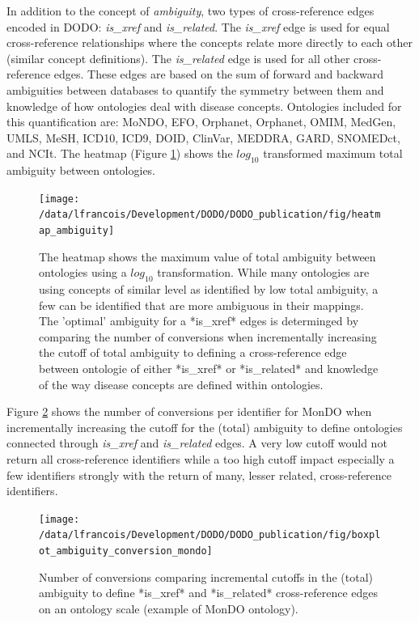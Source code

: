 \documentclass[9pt,a4paper,]{extarticle}
\begin{document}
In addition to the concept of \emph{ambiguity}, two types of cross-reference edges encoded in DODO: \emph{is\_xref} and \emph{is\_related}. The \emph{is\_xref} edge is used for equal cross-reference relationships where the concepts relate more directly to each other (similar concept definitions). The \emph{is\_related} edge is used for all other cross-reference edges. These edges are based on the sum of forward and backward ambiguities between databases to quantify the symmetry between them and knowledge of how ontologies deal with disease concepts. Ontologies included for this quantification are: MoNDO, EFO, Orphanet, Orphanet, OMIM, MedGen, UMLS, MeSH, ICD10, ICD9, DOID, ClinVar, MEDDRA, GARD, SNOMEDct, and NCIt. The heatmap (Figure \ref{fig:heatmapAmbiguity}) shows the \(log_{10}\) transformed maximum total ambiguity between ontologies.

\begin{figure}

{\centering \texttt{[image: /data/lfrancois/Development/DODO/DODO\_publication/fig/heatmap\_ambiguity]} 

}

\caption{The heatmap shows the maximum value of total ambiguity between ontologies using a $log_{10}$ transformation. While many ontologies are using concepts of similar level as identified by low total ambiguity, a few can be identified that are more ambiguous in their mappings. The 'optimal' ambiguity for a *is\_xref* edges is determinged by comparing the number of conversions when incrementally increasing the cutoff of total ambiguity to defining a cross-reference edge between ontologie of either *is\_xref* or *is\_related* and knowledge of the way disease concepts are defined within ontologies.}\label{fig:heatmapAmbiguity}
\end{figure}

Figure \ref{fig:boxplotAmbiguity} shows the number of conversions per identifier for MonDO when incrementally increasing the cutoff for the (total) ambiguity to define ontologies connected through \emph{is\_xref} and \emph{is\_related} edges. A very low cutoff would not return all cross-reference identifiers while a too high cutoff impact especially a few identifiers strongly with the return of many, lesser related, cross-reference identifiers.

\begin{figure}

{\centering \texttt{[image: /data/lfrancois/Development/DODO/DODO\_publication/fig/boxplot\_ambiguity\_conversion\_mondo]} 

}

\caption{Number of conversions comparing incremental cutoffs in the (total) ambiguity to define *is\_xref* and *is\_related* cross-reference edges on an ontology scale (example of MonDO ontology).}\label{fig:boxplotAmbiguity}
\end{figure}
\end{document}
